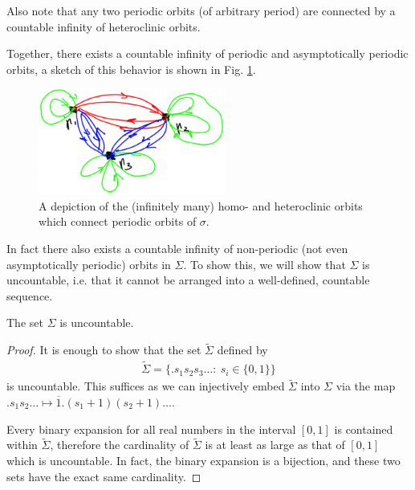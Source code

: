 \begin{remark}[]
Also note that any two periodic orbits (of arbitrary period) are connected by a countable infinity of heteroclinic orbits.
\end{remark}

Together, there exists a countable infinity of periodic and asymptotically periodic orbits, a sketch of this behavior is shown in Fig. \ref{fig:crazy_orbits}.

\begin{figure}[h!]
	\centering
	\includegraphics[width=0.55\textwidth]{figures/ch6/21crazy_orbits.png}
	\caption{A depiction of the (infinitely many) homo- and heteroclinic orbits which connect periodic orbits of $\sigma $.}
	\label{fig:crazy_orbits}
\end{figure}

In fact there also exists a countable infinity of non-periodic (not even asymptotically periodic) orbits in $\Sigma$. To show this, we will show that $\Sigma$ is uncountable, i.e. that it cannot be arranged into a well-defined, countable sequence.
\begin{proposition}[]
	The set $\Sigma$ is uncountable.
\end{proposition}
\begin{proof}
	It is enough to show that the set $\tilde{\Sigma}$ defined by 
	 \begin{align}
		 \tilde{\Sigma} = \{ \bm{.} s_1s_2s_3 \ldots:\ s_i\in \{0,1\}\}
	\end{align}
	is uncountable. This suffices as we can injectively embed $\tilde{\Sigma}$ into $\Sigma$ via the map $\bm{.} s_1s_2\ldots \mapsto \overline{1}\bm{.} (s_1+1)(s_2+1)\ldots$.

	Every binary expansion for all real numbers in the interval $[0,1]$ is contained within $\tilde{\Sigma}$, therefore the cardinality of $\tilde{\Sigma}$ is at least as large as that of $[0,1]$ which is uncountable. In fact, the binary expansion is a bijection, and these two sets have the exact same cardinality. 
\end{proof}

